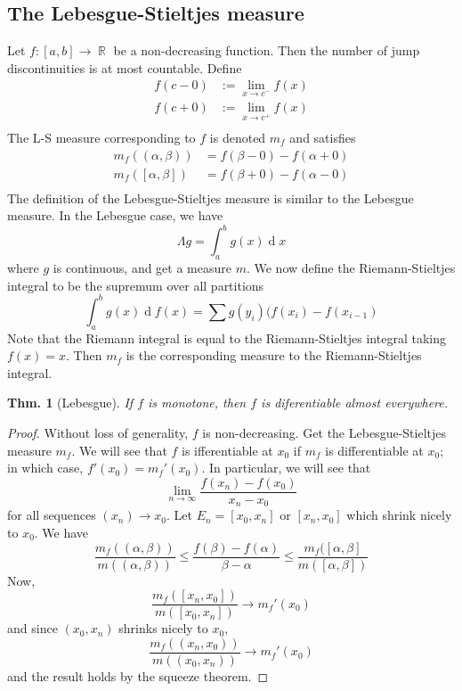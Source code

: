 \documentclass[12pt, a4paper]{book}
\DeclareMathOperator{\R}{\mathbb{R}}
\renewcommand{\d}[1]{\ensuremath{\operatorname{d}\!{#1}}} %
\newtheorem{theorem}{Thm.}[section]
\theoremstyle{nonumberplain}
\newtheorem{proof}{Proof}
\begin{document}
\subsection{The Lebesgue-Stieltjes measure}
Let $f:[a,b]\to\R$ be a non-decreasing function.
Then the number of jump discontinuities is at most countable.
Define
\begin{align*}
    f(c-0) &:= \lim_{x\to c^-}f(x)\\
    f(c+0) &:= \lim_{x\to c^+}f(x)\\
\end{align*}
The L-S measure corresponding to $f$ is denoted $m_f$ and satisfies
\begin{align*}
    m_f((\alpha,\beta)) &= f(\beta-0)-f(\alpha+0)\\
    m_f([\alpha,\beta]) &= f(\beta+0)-f(\alpha-0)\\
\end{align*}
The definition of the Lebesgue-Stieltjes measure is similar to the Lebesgue measure.
In the Lebesgue case, we have
\[\Lambda g=\int_a^b g(x)\d{x}\]
where $g$ is continuous, and get a measure $m$.
We now define the Riemann-Stieltjes integral to be the supremum over all partitions
\begin{equation*}
    \int_a^b g(x)\d{f(x)} = \sum g(y_i)(f(x_i)-f(x_{i-1})
\end{equation*}
Note that the Riemann integral is equal to the Riemann-Stieltjes integral taking $f(x)=x$.
Then $m_f$ is the corresponding measure to the Riemann-Stieltjes integral.
\begin{theorem}[Lebesgue]
    If $f$ is monotone, then $f$ is diferentiable almost everywhere.
\end{theorem}
\begin{proof}
    Without loss of generality, $f$ is non-decreasing.
    Get the Lebesgue-Stieltjes measure $m_f$.
    We will see that $f$ is ifferentiable at $x_0$ if $m_f$ is differentiable at $x_0$; in which case, $f'(x_0)=m_f'(x_0)$.
    In particular, we will see that
    \begin{equation*}
        \lim_{n\to\infty}\frac{f(x_n)-f(x_0)}{x_n-x_0}
    \end{equation*}
    for all sequences $(x_n)\to x_0$.
    Let $E_n=[x_0,x_n]$ or $[x_n,x_0]$ which shrink nicely to $x_0$.
    We have
    \begin{equation*}
        \frac{m_f((\alpha,\beta))}{m((\alpha,\beta))} \leq\frac{f(\beta)-f(\alpha)}{\beta-\alpha}\leq\frac{m_f([\alpha,\beta]}{m([\alpha,\beta])}
    \end{equation*}
    Now,
    \begin{equation*}
        \frac{m_f([x_n,x_0])}{m([x_0,x_n])}\to m_f'(x_0)
    \end{equation*}
    and since $(x_0,x_n)$ shrinks nicely to $x_0$,
    \begin{equation*}
        \frac{m_f((x_n,x_0))}{m((x_0,x_n))}\to m_f'(x_0)
    \end{equation*}
    and the result holds by the squeeze theorem.
\end{proof}
\end{document}
